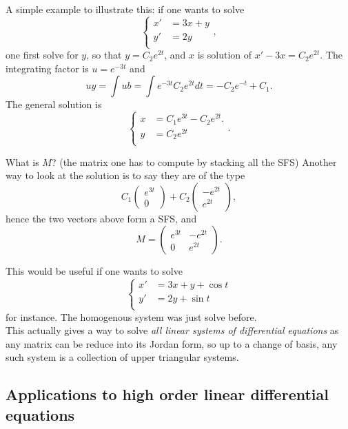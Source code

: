 \begin{itemize}
A simple example to illustrate this: if one wants to solve  
\[\left\{\begin{split}
x' & = 3x +y\\
y' & = 2y \\
\end{split}\right. ,\]
one first solve for $y$, so that $y= C_2 e^{2t}$, and $x$ is solution of $x'-3x = C_2 e^{2t}$. The integrating factor is $u = e^{-3t}$ and 
\[uy = \int ub = \int  e^{-3t} C_2  e^{2t} dt = -C_2 e^{-t} + C_1.\]
The general solution is
\[\left\{\begin{split}
x & =C_1 e^{3t} -C_2 e^{2t}.\\
y & = C_2 e^{2t} \\
\end{split}\right. .\]

What is $M$? (the matrix one has to compute by stacking all the SFS) Another way to look at the solution is to say they are of the type
\[C_1 \begin{pmatrix} e^{3t} \\ 0 \end{pmatrix} + C_2 \begin{pmatrix} -e^{2t} \\ e^{2t} \end{pmatrix},\] 
hence the two vectors above form a SFS, and \[M = \begin{pmatrix} e^{3t} & -e^{2t} \\ 0 & e^{2t}\end{pmatrix}.\]

This would be useful if one wants to solve 
\[\left\{\begin{split}
x' & = 3x +y + \cos t\\
y' & = 2y + \sin t\\
\end{split}\right. \]
for instance. The homogenous system was just solve before. \\

This actually gives a way to solve \textit{all linear systems of differential equations} as any matrix can be reduce into its Jordan form, so up to a change of basis, any such system is a collection of upper triangular systems.\\

\subsection{Applications to high order linear differential equations}  %


\end{itemize}
